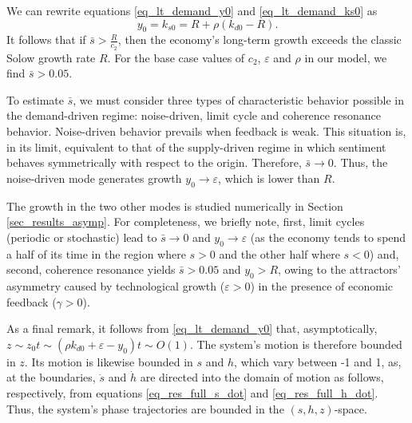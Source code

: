 We can rewrite equations \eqref{eq_lt_demand_y0} and \eqref{eq_lt_demand_ks0} as
\begin{equation}
y_0 = k_{s0} = R + \rho\left(k_{d0} - R\right).
\end{equation}
It follows that if $\bar{s}>\frac{R}{c_2}$, then the economy's long-term growth exceeds the classic Solow growth rate $R$. For the base case values of $c_2$, $\varepsilon$ and $\rho$ in our model, we find $\bar{s}>0.05$. 

To estimate $\bar{s}$, we must consider three types of characteristic behavior possible in the demand-driven regime: noise-driven, limit cycle and coherence resonance behavior. Noise-driven behavior prevails when feedback is weak. This situation is, in its limit, equivalent to that of the supply-driven regime in which sentiment behaves symmetrically with respect to the origin. Therefore, $\bar{s}\rightarrow0$. Thus, the noise-driven mode generates growth $y_0\rightarrow\varepsilon$, which is lower than $R$.

The growth in the two other modes is studied numerically in Section \ref{sec_results_asymp}. For completeness, we briefly note, first, limit cycles (periodic or stochastic) lead to $\bar{s}\rightarrow0$ and $y_0\rightarrow\varepsilon$ (as the economy tends to spend a half of its time in the region where $s>0$ and the other half where $s<0$) and, second, coherence resonance yields $\bar{s}>0.05$ and $y_0>R$, owing to the attractors' asymmetry caused by technological growth ($\varepsilon>0$) in the presence of economic feedback ($\gamma>0$). 

As a final remark, it follows from \eqref{eq_lt_demand_y0} that, asymptotically, $z\sim z_0t\sim(\rho k_{d0}+\varepsilon - y_0) t \sim  O(1)$. The system's motion is therefore bounded in $z$. Its motion is likewise bounded in $s$ and $h$, which vary between -1 and 1, as, at the boundaries, $\dot{s}$ and $\dot{h}$ are directed into the domain of motion as follows, respectively, from equations \eqref{eq_res_full_s_dot} and \eqref{eq_res_full_h_dot}. Thus, the system's phase trajectories are bounded in the $(s, h, z)$-space.


